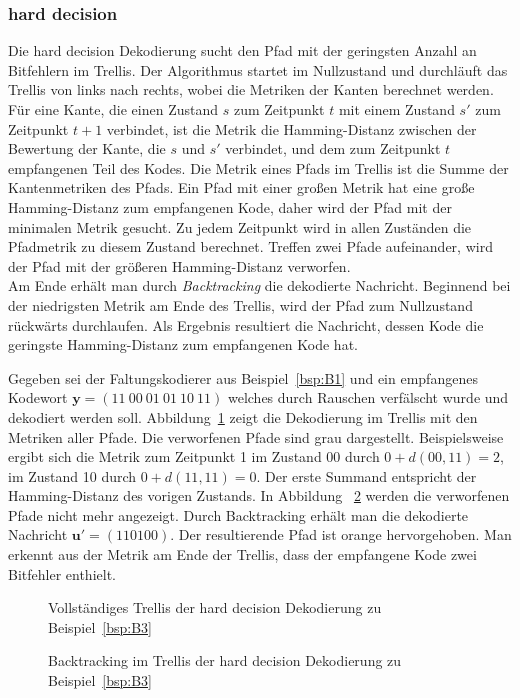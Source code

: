 \subsubsection{hard decision}
\label{kapitel:grundlagen_hard_decision}
Die hard decision Dekodierung sucht den Pfad mit der geringsten Anzahl an Bitfehlern im Trellis. Der Algorithmus startet im Nullzustand und durchläuft das Trellis von links nach rechts, wobei die Metriken der Kanten berechnet werden. Für eine Kante, die einen Zustand $s$ zum Zeitpunkt $t$ mit einem Zustand $s'$ zum Zeitpunkt $t+1$ verbindet, ist die Metrik die Hamming-Distanz zwischen der Bewertung der Kante, die $s$ und $s'$ verbindet, und dem zum Zeitpunkt $t$ empfangenen Teil des Kodes. Die Metrik eines Pfads im Trellis ist die Summe der Kantenmetriken des Pfads. Ein Pfad mit einer großen Metrik hat eine große Hamming-Distanz zum empfangenen Kode, daher wird der Pfad mit der minimalen Metrik gesucht. Zu jedem Zeitpunkt wird in allen Zuständen die Pfadmetrik zu diesem Zustand berechnet. Treffen zwei Pfade aufeinander, wird der Pfad mit der größeren Hamming-Distanz verworfen.
\\
Am Ende erhält man durch \emph{Backtracking} die dekodierte Nachricht. Beginnend bei der niedrigsten Metrik am Ende des Trellis, wird der Pfad zum Nullzustand rückwärts durchlaufen. Als Ergebnis resultiert die Nachricht, dessen Kode die geringste Hamming-Distanz zum empfangenen Kode hat.
\begin{beispiel}
Gegeben sei der Faltungskodierer aus Beispiel~\ref{bsp:B1} und ein empfangenes Kodewort $\mathbf{y}=\left( 11~00~01~01~10~11\right)$ welches durch Rauschen verfälscht wurde und dekodiert werden soll. Abbildung~\ref{abb:trellis_dek_hard_a} zeigt die Dekodierung im Trellis mit den Metriken aller Pfade. Die verworfenen Pfade sind grau dargestellt. Beispielsweise ergibt sich die Metrik zum Zeitpunkt 1 im Zustand 00 durch $0+d(00,11)=2$, im Zustand 10 durch $0+d(11,11)=0$. Der erste Summand entspricht der Hamming-Distanz des vorigen Zustands. In Abbildung~ \ref{abb:trellis_dek_hard_b} werden die verworfenen Pfade nicht mehr angezeigt. Durch Backtracking erhält man die dekodierte Nachricht $\mathbf{u'}=\left( 110100\right)$. Der resultierende Pfad ist orange hervorgehoben. Man erkennt aus der Metrik am Ende der Trellis, dass der empfangene Kode zwei Bitfehler enthielt.
\label{bsp:B3}
\end{beispiel}

\begin{figure}[t]
	\centering
	\resizebox{0.70\textwidth}{!}{%
		
	}
	\caption{Vollständiges Trellis der hard decision Dekodierung zu Beispiel~\ref{bsp:B3}}
	\label{abb:trellis_dek_hard_a}
\end{figure}
\begin{figure}[t]
	\centering
	\resizebox{0.70\textwidth}{!}{%
		
	}
	\caption{Backtracking im Trellis der hard decision Dekodierung zu Beispiel~\ref{bsp:B3}}
	\label{abb:trellis_dek_hard_b}
\end{figure}


